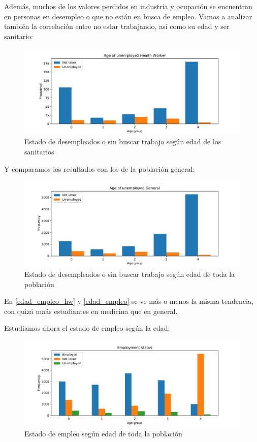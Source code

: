 \documentclass[twoside,openright,titlepage,numbers=noenddot,openany,headinclude,footinclude=true,
cleardoublepage=empty,abstractoff,BCOR=5mm,paper=a4,fontsize=12pt,main=spanish]{scrreprt}
\begin{document}
Además, muchos de los valores perdidos en industria y ocupación se encuentran en personas en desempleo o que no están en busca de empleo. Vamos a analizar también la correlación entre no estar trabajando, así como su edad y ser sanitario:

\begin{figure}[H]
\includegraphics[scale=0.5]{edad_hw.pdf}
\caption{Estado de desempleados o sin buscar trabajo según edad de los sanitarios}
\label{edad_empleo_hw}
\end{figure}

Y comparamos los resultados con los de la población general:

\begin{figure}[H]
\includegraphics[scale=0.5]{unemployed_edad.pdf}
\caption{Estado de desempleados o sin buscar trabajo según edad de toda la población}
\label{edad_empleo}
\end{figure}

En \eqref{edad_empleo_hw} y \eqref{edad_empleo} se ve más o menos la misma tendencia, con quizá maás estudiantes en medicina que en general.

Estudiamos ahora el estado de empleo según la edad:

\begin{figure}[H]
\includegraphics[scale=0.5]{employment_status_segun_age.pdf}
\caption{Estado de empleo según edad de toda la población}
\label{edad_empleo_completo}
\end{figure}
\end{document}
